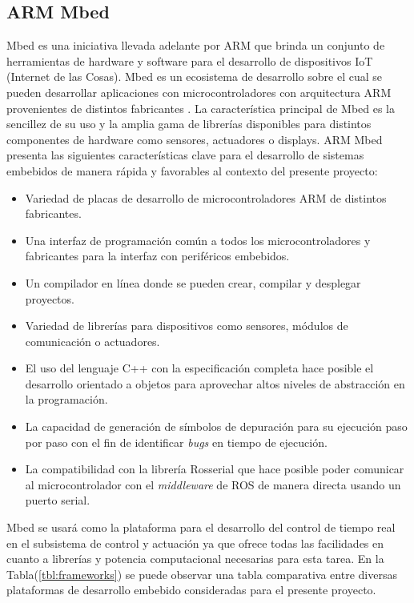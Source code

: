     \subsection{ARM Mbed}
    Mbed es una iniciativa llevada adelante por ARM que brinda un conjunto de herramientas de hardware y software para el 
    desarrollo de dispositivos IoT (Internet de las Cosas). Mbed es un ecosistema de desarrollo sobre el cual se pueden 
    desarrollar aplicaciones con microcontroladores con arquitectura ARM provenientes de distintos fabricantes \cite{mbed}. La 
    característica principal de Mbed es la sencillez de su uso y la amplia gama de librerías disponibles para distintos componentes 
    de hardware como sensores, actuadores o displays. ARM Mbed presenta las siguientes características clave para el desarrollo 
    de sistemas embebidos de manera rápida y favorables al contexto del presente proyecto:

    \begin{itemize}
        \item Variedad de placas de desarrollo de microcontroladores ARM de distintos fabricantes.
        \item Una interfaz de programación común a todos los microcontroladores y fabricantes para la interfaz con 
        periféricos embebidos.
        \item Un compilador en línea donde se pueden crear, compilar y desplegar proyectos.
        \item Variedad de librerías para dispositivos como sensores, módulos de comunicación o actuadores.
        \item El uso del lenguaje C++ con la especificación completa hace posible el desarrollo orientado 
        a objetos para aprovechar altos niveles de abstracción en la programación.
        \item La capacidad de generación de símbolos de depuración para su ejecución paso por paso con el fin de 
        identificar \textit{bugs} en tiempo de ejecución.
        \item La compatibilidad con la librería Rosserial que hace posible poder comunicar al microcontrolador 
        con el \textit{middleware} de ROS de manera directa usando un puerto serial.
    \end{itemize}

    Mbed se usará como la plataforma para el desarrollo del control de tiempo real en el subsistema de control y actuación 
    ya que ofrece todas las facilidades en cuanto a librerías y potencia computacional necesarias para esta tarea. En la 
    Tabla(\ref{tbl:frameworks}) se puede observar una tabla comparativa entre diversas plataformas de desarrollo embebido 
    consideradas para el presente proyecto.


